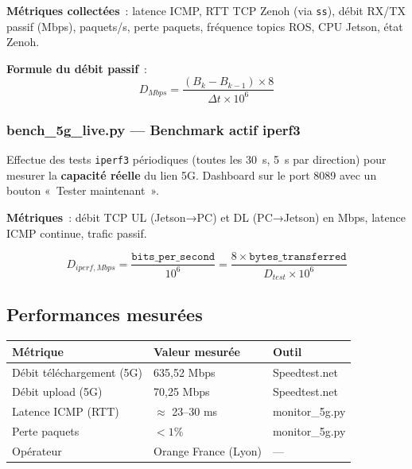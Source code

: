 \documentclass[a4paper,11pt]{article}
\begin{document}
\textbf{Métriques collectées}~: latence ICMP, RTT TCP Zenoh (via \texttt{ss}),
débit RX/TX passif (Mbps), paquets/s, perte paquets, fréquence topics ROS,
CPU Jetson, état Zenoh.

\textbf{Formule du débit passif}~:
\begin{equation}
  D_{Mbps} = \frac{(B_k - B_{k-1}) \times 8}{\Delta t \times 10^6}
\end{equation}

\subsubsection{bench\_5g\_live.py — Benchmark actif iperf3}

Effectue des tests \texttt{iperf3} périodiques (toutes les 30~s, 5~s par direction)
pour mesurer la \textbf{capacité réelle} du lien 5G. Dashboard sur le port 8089 avec
un bouton «~Tester maintenant~».

\textbf{Métriques}~: débit TCP UL (Jetson→PC) et DL (PC→Jetson) en Mbps,
latence ICMP continue, trafic passif.

\begin{equation}
  D_{iperf,Mbps} = \frac{\texttt{bits\_per\_second}}{10^6}
  = \frac{8 \times \texttt{bytes\_transferred}}{D_{test} \times 10^6}
\end{equation}

\subsection{Performances mesurées}

\begin{center}
\begin{tabular}{lll}
\toprule
\textbf{Métrique} & \textbf{Valeur mesurée} & \textbf{Outil} \\
\midrule
Débit téléchargement (5G) & 635,52 Mbps & Speedtest.net \\
Débit upload (5G)         & 70,25 Mbps  & Speedtest.net \\
Latence ICMP (RTT)        & $\approx$ 23--30 ms & monitor\_5g.py \\
Perte paquets             & $< 1\%$ & monitor\_5g.py \\
Opérateur                 & Orange France (Lyon) & — \\
\bottomrule
\end{tabular}
\end{center}


\newpage
\end{document}
